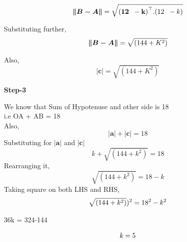 \documentclass[10pt,a4paper]{report}
\begin{document}
\begin{multicols}{2}
    \begin{equation}
\boldsymbol{\|B-A\|} = \sqrt{ \mathbf{(12 \hspace{2mm} -k)}^\top.(12 \hspace{2mm}
-k)}\vspace{2mm}
  \end{equation}
\raggedright Substituting further,\\ 
\begin{equation}
 \boldsymbol{\|B-A\|} = \sqrt{(144+K^2)}\vspace{2mm}
 \end{equation}
 \raggedright Also,
 \begin{equation}
     \boldsymbol{|c|} = \sqrt{(144+K^2)}
 \end{equation}\vspace{2mm}


 \textbf{Step-3}\vspace{2mm}
 
 We know that Sum of Hypotenuse and other side is 18 \\
 i.e OA + AB = 18 \\\vspace{2mm} 
 Also,\\
\begin{equation}
     \boldsymbol{|a|} + \boldsymbol{|c|} =18
 \end{equation}
 Substituting for $\boldsymbol{|a|}$ and $\boldsymbol{|c|}$\\\vspace{2mm} 
\begin{equation}
    k + \sqrt{(144 + k^2)} = 18
\end{equation}
Rearranging it,\\\vspace{2mm} 
\begin{equation}
 \sqrt{(144 + k^2)} = 18 - k
\end{equation} 
Taking square on both LHS and RHS, \vspace{2mm}
\begin{equation}
 \sqrt{(144 + k^2)})^2 = 18^2 - k^2\vspace{2mm} 
 \end{equation}
 \begin{center}
 36k = 324-144 \vspace{2mm} 
  \end{center}
 \begin{equation}
 k=5\vspace{2mm}
  \end{equation}
 

\end{multicols}
\end{document}
